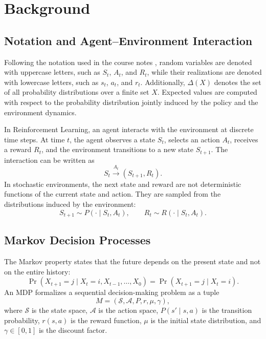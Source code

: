 \documentclass{article}
\begin{document}
\section{Background}

\subsection{Notation and Agent--Environment Interaction}
Following the notation used in the course notes \cite{course_notes}, random variables are denoted with uppercase letters, such as $S_t$, $A_t$, and $R_t$, while their realizations are denoted with lowercase letters, such as $s_t$, $a_t$, and $r_t$. Additionally, $\Delta(X)$ denotes the set of all probability distributions over a finite set $X$. Expected values are computed with respect to the probability distribution jointly induced by the policy and the environment dynamics.

In Reinforcement Learning, an agent interacts with the environment at discrete time steps. At time $t$, the agent observes a state $S_t$, selects an action $A_t$, receives a reward $R_t$, and the environment transitions to a new state $S_{t+1}$. The interaction can be written as
\begin{equation}
    S_t \xrightarrow{A_t} (S_{t+1}, R_t).
\end{equation}
In stochastic environments, the next state and reward are not deterministic functions of the current state and action. They are sampled from the distributions induced by the environment:
\begin{equation}
    S_{t+1} \sim P(\cdot \mid S_t, A_t),
    \qquad
    R_t \sim R(\cdot \mid S_t, A_t).
\end{equation}

\subsection{Markov Decision Processes}
The Markov property states that the future depends on the present state and not on the entire history:
\begin{equation}
    \Pr(X_{t+1}=j \mid X_t=i, X_{t-1}, \ldots, X_0)
    =
    \Pr(X_{t+1}=j \mid X_t=i).
\end{equation}
An MDP formalizes a sequential decision-making problem as a tuple
\begin{equation}
    M = (\mathcal{S}, \mathcal{A}, P, r, \mu, \gamma),
\end{equation}
where $\mathcal{S}$ is the state space, $\mathcal{A}$ is the action space, $P(s' \mid s,a)$ is the transition probability, $r(s,a)$ is the reward function, $\mu$ is the initial state distribution, and $\gamma \in [0,1]$ is the discount factor.
\end{document}
